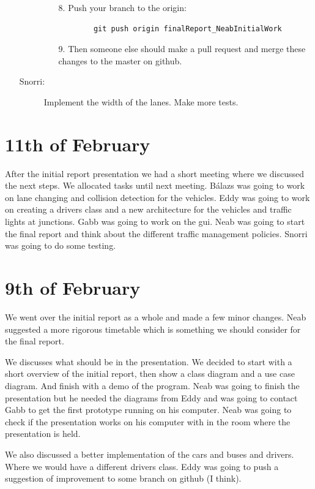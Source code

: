 \documentclass[11pt]{article}
\begin{document}
\begin{itemize}
\begin{description}
\begin{itemize}
\begin{verbatim}
		\end{verbatim}
		\item[8.] Push your branch to the origin:
		\begin{verbatim}
		git push origin finalReport_NeabInitialWork
		\end{verbatim}
		\item[9.] Then someone else should make a pull request and merge these changes to the master on github.
	\end{itemize}
	\item[Snorri: ]Implement the width of the lanes. Make more tests.
	\end{description}	 
\end{itemize}

 

\section{11th of February}
After the initial report presentation we had a short meeting where we discussed the next steps. We allocated tasks until next meeting. Bálazs was going to work on lane changing and collision detection for the vehicles. Eddy was going to work on creating a drivers class and a new architecture for the vehicles and traffic lights at junctions. Gabb was going to work on the gui. Neab was going to start the final report and think about the different traffic management policies. Snorri was going to do some testing. 

\section{9th of February}
We went over the initial report as a whole and made a few minor changes. Neab suggested a more rigorous timetable which is something we should consider for the final report.

We discusses what should be in the presentation. We decided to start with a short overview of the initial report, then show a class diagram and a use case diagram. And finish with a demo of the program. Neab was going to finish the presentation but he needed the diagrams from Eddy and was going to contact Gabb to get the first prototype running on his computer. Neab was going to check if the presentation works on his computer with in the room where the presentation is held.

We also discussed a better implementation of the cars and buses and drivers. Where we would have a different drivers class. Eddy was going to push a suggestion of improvement to some branch on github (I think).
\end{document}
